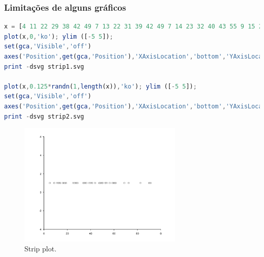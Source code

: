 \begin{frame}
\frametitle{Limitações de alguns gráficos}
\begin{lstlisting}[language=Octave, label=lst-scatters, caption={Gráfico de espalhamento com 3 grupos.}, postbreak=\mbox{$\hookrightarrow$\space}, basicstyle=\fontsize{8}{10}\selectfont\ttfamily]
x = [4 11 22 29 38 42 49 7 13 22 31 39 42 49 7 14 23 32 40 43 55 9 15 27 33 40 45 58 10 15 27 33 40 47 66 10 20 28 35 40 48 72 11 21 28 38 42 48 73];
plot(x,0,'ko'); ylim ([-5 5]);
set(gca,'Visible','off')
axes('Position',get(gca,'Position'),'XAxisLocation','bottom','YAxisLocation','left', 'Color','none','XTickLabel',get(gca,'XTickLabel'),'YTickLabel',get(gca,'YTickLabel'),'XColor','k','YColor','k','LineWidth',1,'TickDir','out');
print -dsvg strip1.svg

plot(x,0.125*randn(1,length(x)),'ko'); ylim ([-5 5]);
set(gca,'Visible','off')
axes('Position',get(gca,'Position'),'XAxisLocation','bottom','YAxisLocation','left', 'Color','none','XTickLabel',get(gca,'XTickLabel'),'YTickLabel',get(gca,'YTickLabel'),'XColor','k','YColor','k','LineWidth',1,'TickDir','out');
print -dsvg strip2.svg
\end{lstlisting}

\framebreak

\begin{figure}[h]
 \centering
  \includegraphics[width=0.7\textwidth,height=0.7\textheight,keepaspectratio]{figures/strip1.pdf}
 \caption{Strip plot.}
 \label{fig-strip1}
\end{figure}

\framebreak


\end{frame}
